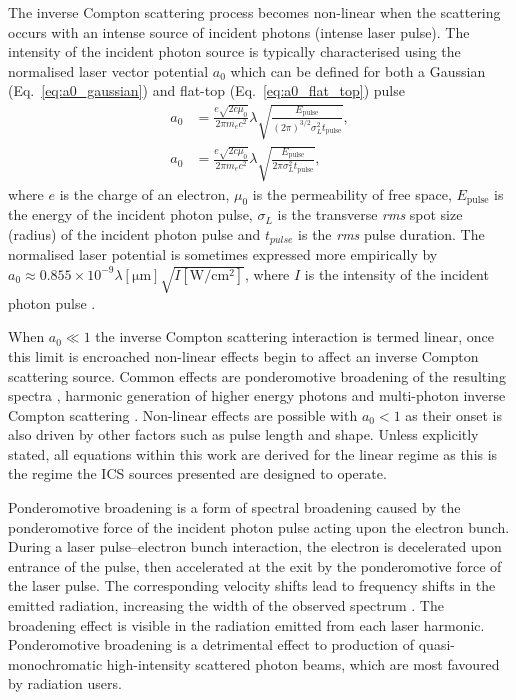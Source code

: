 \documentclass[../main.tex]{subfiles}
\begin{document}
The inverse Compton scattering process becomes non-linear when the scattering occurs with an intense source of incident photons (intense laser pulse). The intensity of the incident photon source is typically characterised using the normalised laser vector potential $a_{0}$ which can be defined for both a Gaussian (Eq.~\ref{eq:a0_gaussian}) and flat-top (Eq.~\ref{eq:a0_flat_top}) pulse \cite{terzic2019improving}
\begin{align}
a_{0} &= \frac{e\sqrt{2c\mu_{0}}}{2\pi m_{e}c^{2}}\lambda\sqrt{\frac{E_{\mathrm{pulse}}}{\left(2\pi\right)^{3/2}\sigma_{L}^{2}t_{\mathrm{pulse}}}},
\label{eq:a0_gaussian} \\
a_{0} &= \frac{e\sqrt{2c\mu_{0}}}{2\pi m_{e}c^{2}}\lambda\sqrt{\frac{E_{\mathrm{pulse}}}{2\pi\sigma_{L}^{2}t_{\mathrm{pulse}}}},
\label{eq:a0_flat_top}
\end{align}
where $e$ is the charge of an electron, $\mu_{0}$ is the permeability of free space, $E_{\mathrm{pulse}}$ is the energy of the incident photon pulse, $\sigma_{L}$ is the transverse \textit{rms} spot size (radius) of the incident photon pulse and $t_{pulse}$ is the \textit{rms} pulse duration. The normalised laser potential is sometimes expressed more empirically by $a_{0} \approx 0.855\times 10^{-9} \lambda\left[\mathrm{\mu m}\right]\sqrt{I\left[\mathrm{W/cm^{2}}\right]}$, where $I$ is the intensity of the incident photon pulse \cite{li2004high}.

When $a_{0} \ll 1$ the inverse Compton scattering interaction is termed linear, once this limit is encroached non-linear effects begin to affect an inverse Compton scattering source. Common effects are ponderomotive broadening of the resulting spectra \cite{krafft2004spectral}, harmonic generation of higher energy photons \cite{sarachik1970classical,babzien2006observation} and multi-photon inverse Compton scattering \cite{bula1996observation}. Non-linear effects are possible with $a_{0}<1$ as their onset is also driven by other factors such as pulse length and shape. Unless explicitly stated, all equations within this work are derived for the linear regime as this is the regime the ICS sources presented are designed to operate.

Ponderomotive broadening is a form of spectral broadening caused by the ponderomotive force of the incident photon pulse acting upon the electron bunch. During a laser pulse--electron bunch interaction, the electron is decelerated upon entrance of the pulse, then accelerated at the exit by the ponderomotive force of the laser pulse. The corresponding velocity shifts lead to frequency shifts in the
emitted radiation, increasing the width of the observed
spectrum \cite{krafft2004spectral}. The broadening effect is visible in the radiation emitted from each laser harmonic. Ponderomotive broadening is a detrimental effect to production of quasi-monochromatic high-intensity scattered photon beams, which are most favoured by radiation users. 
\end{document}
